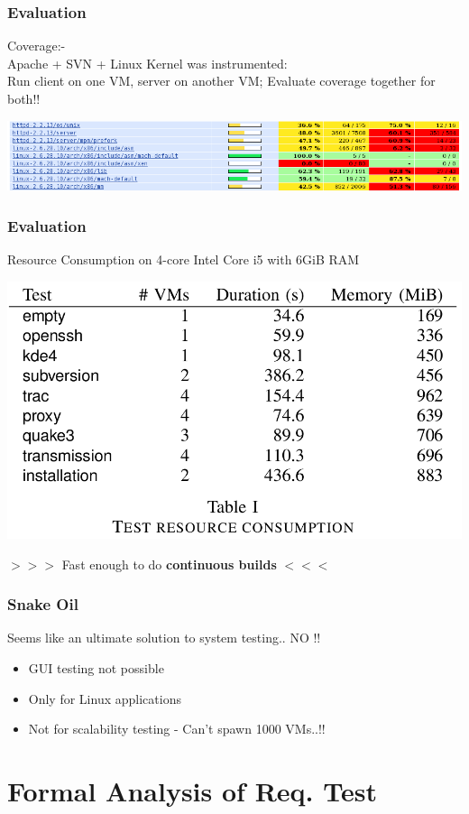 \documentclass[compress,red]{beamer}
\begin{document}
\frame
{
	\frametitle{Evaluation}
	Coverage:- \\
	\pause
	Apache + SVN + Linux Kernel was instrumented: \\
	\pause
	Run client on one VM, server on another VM; Evaluate coverage together for both!!
	\pause
	\begin{center}
	\includegraphics[scale=0.35]{vm-coverage.png}
	\end{center}
}

\frame
{
	\frametitle{Evaluation}
	Resource Consumption on 4-core Intel Core i5 with 6GiB RAM
	\begin{center}
	\includegraphics[scale=0.26]{vm-resource.png}
	\end{center}
	\pause
	$>>>$ Fast enough to do \textbf{continuous builds} $<<<$
}

\frame
{
	\frametitle{Snake Oil}
	\pause
	Seems like an ultimate solution to system testing..
	\pause
	NO !!
	\begin{itemize}
		\pause
		\item GUI testing not possible
		\pause
		\item Only for Linux applications
		\pause
		\item Not for scalability testing - Can't spawn 1000 VMs..!!
	\end{itemize}
}

\section{Formal Analysis of Req. Test}
\end{document}
